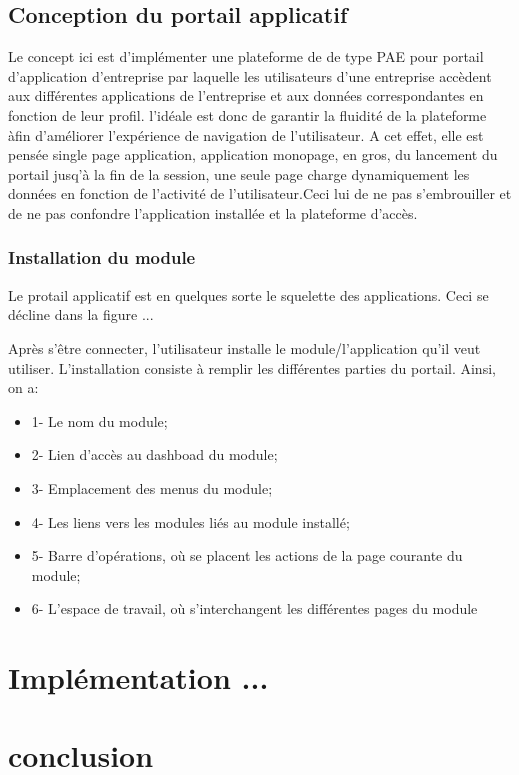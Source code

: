 \documentclass[a4paper,12pt]{article}
\begin{document}
\subsection{Conception du portail applicatif}%
 Le concept ici est
d'implémenter une plateforme de de type PAE pour portail d'application d'entreprise par laquelle
les utilisateurs d'une entreprise accèdent aux différentes
applications de l'entreprise et aux données correspondantes en
fonction de leur profil. l'idéale est donc de garantir la
fluidité de la plateforme àfin d'améliorer l'expérience de navigation de
l'utilisateur. A cet effet, elle est pensée single page application,
application monopage, en gros, du lancement du portail jusq'à la fin de la
session, une seule page charge dynamiquement les données en fonction
de l'activité de l'utilisateur.Ceci lui de ne pas
s'embrouiller et de ne pas confondre l'application installée et la
plateforme d'accès.  
   
\subsubsection{Installation du module}
Le protail applicatif est en quelques sorte le squelette des
applications. Ceci se décline dans la figure ...

Après s'être connecter, l'utilisateur installe le module/l'application 
qu'il veut utiliser. L'installation consiste à remplir les différentes
parties du portail. Ainsi, on a:

\begin{itemize}
\item 1- Le nom du module;
\item 2- Lien d'accès au dashboad du module;
\item 3- Emplacement des menus du module;
\item 4- Les liens vers les modules liés au module installé;
\item 5- Barre d'opérations, où se placent les actions de la page
  courante du module;
\item 6- L'espace de travail, où s'interchangent les différentes pages
  du module
\end{itemize}

\section{Implémentation ...}
\section{conclusion}
\end{document}
